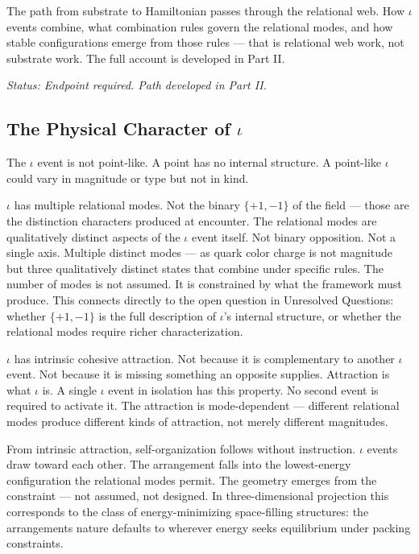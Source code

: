 \documentclass[11pt,letterpaper]{article}
\begin{document}
The path from substrate to Hamiltonian passes through the relational web. How \(\iota\) events combine, what combination rules govern the relational modes, and how stable configurations emerge from those rules --- that is relational web work, not substrate work. The full account is developed in Part II.

\emph{Status: Endpoint required. Path developed in Part II.}

\subsection{The Physical Character of \(\iota\)}
\label{sec:orge282233}

The \(\iota\) event is not point-like. A point has no internal structure. A point-like \(\iota\) could vary in magnitude or type but not in kind.

\(\iota\) has multiple relational modes. Not the binary \(\{+1,-1\}\) of the field --- those are the distinction characters produced at encounter. The relational modes are qualitatively distinct aspects of the \(\iota\) event itself. Not binary opposition. Not a single axis. Multiple distinct modes --- as quark color charge is not magnitude but three qualitatively distinct states that combine under specific rules. The number of modes is not assumed. It is constrained by what the framework must produce. This connects directly to the open question in Unresolved Questions: whether \(\{+1,-1\}\) is the full description of \(\iota\)'s internal structure, or whether the relational modes require richer characterization.

\(\iota\) has intrinsic cohesive attraction. Not because it is complementary to another \(\iota\) event. Not because it is missing something an opposite supplies. Attraction is what \(\iota\) is. A single \(\iota\) event in isolation has this property. No second event is required to activate it. The attraction is mode-dependent --- different relational modes produce different kinds of attraction, not merely different magnitudes.

From intrinsic attraction, self-organization follows without instruction. \(\iota\) events draw toward each other. The arrangement falls into the lowest-energy configuration the relational modes permit. The geometry emerges from the constraint --- not assumed, not designed. In three-dimensional projection this corresponds to the class of energy-minimizing space-filling structures: the arrangements nature defaults to wherever energy seeks equilibrium under packing constraints.
\end{document}
